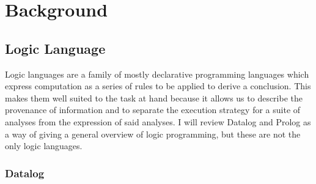 \chapter{Background}
\label{chap:background}
\section{Logic Language}
Logic languages are a family of mostly declarative programming languages which express computation as a series of rules to be applied to derive a conclusion.
This makes them well suited to the task at hand because it allows us to describe the provenance of information and to separate the execution strategy for a suite of analyses from the expression of said analyses.
I will review Datalog and Prolog as a way of giving a general overview of logic programming, but these are not the only logic languages.
\subsection{Datalog}
\label{sec:fchain}
